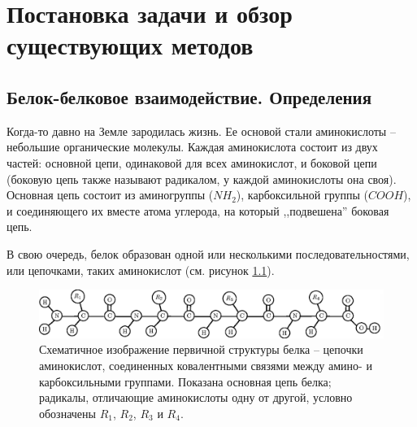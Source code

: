 \graphicspath{{../images/intro/}}
\chapter{Постановка задачи и обзор существующих методов}




\section{Белок-белковое взаимодействие. Определения}

Когда-то давно на Земле зародилась жизнь. Ее основой стали аминокислоты -- небольшие органические молекулы. Каждая аминокислота состоит из двух частей: основной цепи, одинаковой для всех аминокислот, и боковой цепи (боковую цепь также называют радикалом, у каждой аминокислоты она своя). Основная цепь состоит из аминогруппы ($NH_2$), карбоксильной группы ($COOH$), и соединяющего их вместе атома углерода, на который ,,подвешена'' боковая цепь. 

В свою очередь, белок образован одной или несколькими последовательностями, или цепочками, таких аминокислот (см. рисунок \ref{fig:aa3_1}).

\begin{figure}[h]
%
\includegraphics[width=\linewidth]{aa3_1.eps}
\caption{\small{Схематичное изображение первичной структуры белка -- цепочки аминокислот, соединенных ковалентными связями между амино- и карбоксильными группами. Показана основная цепь белка; радикалы, отличающие аминокислоты одну от другой, условно обозначены $R_1$, $R_2$, $R_3$ и $R_4$. }}
\label{fig:aa3_1}
\end{figure}

